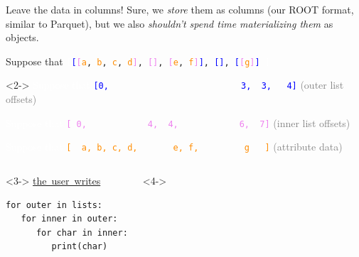 \documentclass[aspectratio=169]{beamer}
\begin{document}
\begin{frame}[fragile]{Leave the data in columns!}
\vspace{0.5 cm}
Sure, we {\it store} them as columns (our ROOT format, similar to Parquet), but we also {\it shouldn't spend time materializing them} as objects.

\vspace{0.25 cm}
Suppose that {\tt\small \textcolor{white}{[}\textcolor{blue}{[}\textcolor{violet}{[}\textcolor{darkorange}{a}, \textcolor{darkorange}{b}, \textcolor{darkorange}{c}, \textcolor{darkorange}{d}\textcolor{violet}{]}, \textcolor{violet}{[]}, \textcolor{violet}{[}\textcolor{darkorange}{e}, \textcolor{darkorange}{f}\textcolor{violet}{]}\textcolor{blue}{]}, \textcolor{blue}{[]}, \textcolor{blue}{[}\textcolor{violet}{[}\textcolor{darkorange}{g}\textcolor{violet}{]}\textcolor{blue}{]}\ \textcolor{white}{]}} 

\begin{uncoverenv}<2->
\textcolor{white}{Suppose that}
             {\tt\small \textcolor{blue}{[0,\ \ \ \ \ \ \ \ \ \ \ \ \ \ \ \ \ \ \ \ \ \ \ \ \ \ 3,\ \ 3,\ \ \ 4]}} \textcolor{gray}{(outer list offsets)}

\textcolor{white}{Suppose that}
             {\tt\small \textcolor{violet}{[\ 0,\ \ \ \ \ \ \ \ \ \ \ \ 4,\ \ 4,\ \ \ \ \ \ \ \ \ \ \ \ 6,\ \ 7]}} \textcolor{gray}{(inner list offsets)}

\textcolor{white}{Suppose that}
             {\tt\small \textcolor{darkorange}{[\ \ a,\ b,\ c,\ d,\ \ \ \ \ \ \ e,\ f,\ \ \ \ \ \ \ \ \ g\ \ \ ]}} \textcolor{gray}{(attribute data)}
\end{uncoverenv}

\vspace{0.5 cm}
\begin{columns}[t]
\begin{uncoverenv}<3->
\mbox{\hspace{-0.1 cm}\underline{the user writes}}

\vspace{-0.25 cm}
\small
\begin{verbatim}
for outer in lists:
   for inner in outer:
      for char in inner:
         print(char)
\end{verbatim}
\end{uncoverenv}

\begin{uncoverenv}<4->
\mbox{\hspace{-0.1 cm}}


\end{uncoverenv}
\end{columns}
\end{frame}
\end{document}
